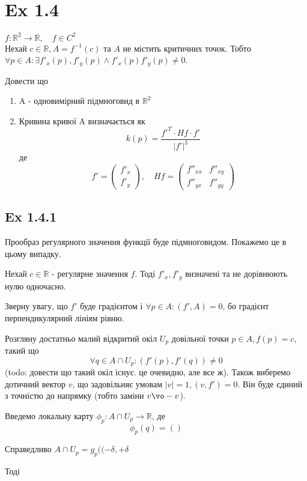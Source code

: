\documentclass[10pt, a4paper]{article} %
\newcommand{\R}{\mathbb{R}}
\begin{document}
\section*{Ex 1.4}
\begin{mdframed}
    $f : \R^2 \to \R, \quad f\in C^2$\\
    Нехай $c\in \R, A = f^{-1}(c)$ та $A$ не містить критичних точок.
    Тобто $\forall p\in A: \exists f'_x(p), f'_y(p) \land f'_x(p)f'_y(p) \ne 0$.

    Довести що 
    \begin{enumerate}
        \item A - одновимірний підмноговид в $\R^2$
        \item Кривина кривої A визначається як
        \[k(p) = \frac{f'^T \cdot Hf \cdot f'}{|f'|^3}\]
        де
        \[f' = \begin{pmatrix}
            f'_x \\ f'_y
        \end{pmatrix}, \quad Hf = \begin{pmatrix}
            f''_{xx} & f''_{xy}\\ f''_{yx} & f''_{yy}
        \end{pmatrix}\]
    \end{enumerate}
\end{mdframed}

\subsection*{Ex 1.4.1}
Прообраз регулярного значення функції буде підмноговидом.
Покажемо це в цьому випадку.

Нехай $c\in \R$ - регулярне значення $f$.
Тоді $f'_x, f'_y$ визначені та не дорівнюють нулю одночасно.

Зверну увагу, що $f'$ буде градієнтом і $\forall p \in A: (f', A) = 0$, 
бо градієнт перпендикулярний лініям рівню.

Розгляну достатньо малий відкритий окіл $U_p$ довільної точки $p \in A, f(p)=c$, 
такий що 
\[\forall q \in A \cap U_p: (f'(p), f'(q))\ne 0\]
(todo: довести що такий окіл існує. це очевидно, але все ж).
Також виберемо дотичний вектор $v$, що задовільняє умовам $|v|=1, (v,f')=0$. 
Він буде єдиний з точністю до напрямку (тобто заміни $v \vo -v$).

Введемо локальну карту $\phi_p : A \cap U_p \to \R$, де
\[\phi_p(q) = ()\]

Справедливо $A\cap U_p = g_p((-\delta,+\delta$ 

Тоді 
\end{document}
